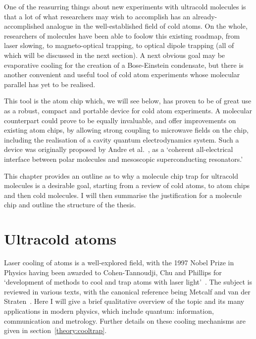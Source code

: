 
One of the reasurring things about new experiments with ultracold molecules is
that a lot of what researchers may wish to accomplish has an
already-accomplished analogue in the well-established field of cold atoms. On
the whole, researchers of molecules have been able to foolow this existing
roadmap, from laser slowing, to magneto-optical trapping, to optical dipole
trapping (all of which will be discussed in the next section). A next obvious goal may
be evaporative cooling for the creation of a Bose-Einstein condensate, but
there is another convenient and useful tool of cold atom experiments whose
molecular parallel has yet to be realised.

This tool is the atom chip which, we will see below, has proven to be of great
use as a robust, compact and portable device for cold atom experiments. A
molecular counterpart could prove to be equally invaluable, and offer
improvements on existing atom chips, by allowing strong coupling to microwave
fields on the chip, including the realisation of a cavity quantum
electrodynamics system. Such a device was originally proposed by Andre et
al.~\cite{Andre2006}, as a `coherent all-electrical interface between polar
molecules and mesoscopic superconducting resonators.'

This chapter provides an outline as to why a molecule chip trap for ultracold
molecules is a desirable goal, starting from a review of cold atoms, to atom
chips and then cold molecules. I will then summarise the justification for a
molecule chip and outline the structure of the thesis.

\section{Ultracold atoms}

Laser cooling of atoms is a well-explored field, with the 1997 Nobel Prize in
Physics having been awarded to Cohen-Tannoudji, Chu and Phillips for
`development of methods to cool and trap atoms with laser
light'~\cite{RevModPhys.70.721}. The subject is reviewed in various texts, with
the canonical reference being Metcalf and van der Straten~\cite{Metcalf1999}.
Here I will give a brief qualitative overview of the topic and its many
applications in modern physics, which include quantum: information,
communication and metrology. Further details on these cooling mechanisms are
given in section~\ref{theory:cooltrap}.

